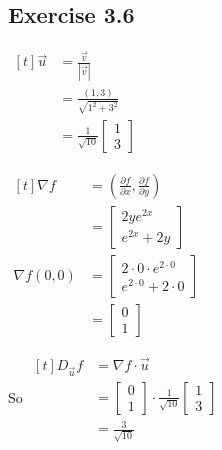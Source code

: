 \subsection*{Exercise 3.6}

\begin{minipage}[t]{0.3\linewidth}
    $\begin{aligned}[t]
        \vec{u} & = \frac{\vec{v}}{| \vec{v} |}                             \\
                & = \frac{(1, 3)}{\sqrt{1^2 + 3^2}}                         \\
                & = \frac{1}{\sqrt{10}}\begin{bmatrix} 1 \\ 3 \end{bmatrix}
    \end{aligned}$
\end{minipage}
\begin{minipage}[t]{0.3\linewidth}
    $\begin{aligned}[t]
        \nabla f 
        & = \left( \frac{\partial f}{\partial x}, \frac{\partial f}{\partial y} \right) \\
        & = \begin{bmatrix} 2ye^{2x} \\ e^{2x} + 2y \end{bmatrix} \\
        \nabla f(0, 0) 
        & = \begin{bmatrix}
            2 \cdot 0 \cdot e^{2 \cdot 0} \\
            e^{2 \cdot 0} + 2 \cdot 0
        \end{bmatrix} \\
        &= \begin{bmatrix} 0 \\ 1 \end{bmatrix}
    \end{aligned}$

\end{minipage}
\begin{minipage}[t]{0.3\linewidth}
    So $\begin{aligned}[t]
        D_{\vec{u}} f 
        & = \nabla f \cdot \vec{u} \\
        & = \begin{bmatrix} 0 \\ 1 \end{bmatrix} \cdot \frac{1}{\sqrt{10}} \begin{bmatrix} 1 \\ 3 \end{bmatrix} \\
        & = \frac{3}{\sqrt{10}}
    \end{aligned}$
\end{minipage}

